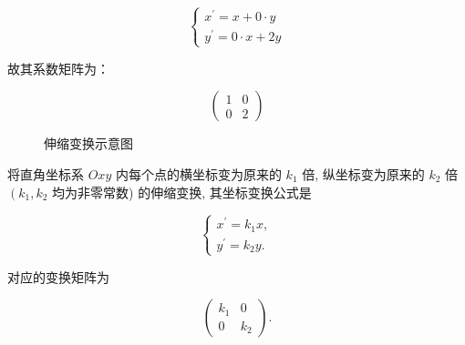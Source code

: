 \begin{equation}
\left\{\begin{array}{l}
x^{\prime}=x  + 0 \cdot y\\
y^{\prime}=0 \cdot x + 2 y
\end{array}\right.
\label{eq:伸缩变换的方程}
\end{equation}

故其系数矩阵为：

\begin{equation}
\left(\begin{array}{rr}
1  & 0 \\
0  & 2
\end{array}\right)
\label{eq:伸缩变换示例矩阵}
\end{equation}


\begin{figure}[h]
\centering
{}
\caption{伸缩变换示意图\label{fig:伸缩变换}}
\end{figure}

\begin{exercise}

    将直角坐标系 $O x y$ 内每个点的横坐标变为原来的 $k_1$ 倍, 纵坐标变为原来的 $k_2$ 倍 $\left(k_1, k_2\right.$ 均为非零常数) 的伸缩变换, 其坐标变换公式是
    
    \begin{equation}
        \left\{\begin{array}{l}
    x^{\prime}=k_1 x, \\
    y^{\prime}=k_2 y .
    \end{array}\right.
    \label{伸缩变换一般表达式}
    \end{equation}
    
    对应的变换矩阵为 
    
    \begin{equation}
    \left(\begin{array}{cc}k_1 & 0 \\ 0 & k_2\end{array}\right).
    \label{伸缩变换一般矩阵}
    \end{equation}

\end{exercise}

